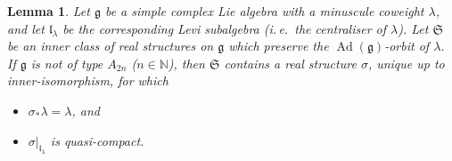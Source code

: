 \documentclass{amsart}
\newcommand{\ie}{i.\,e.}
\newcommand{\Ad}{\operatorname{Ad}}
\newcommand{\g}{\mathfrak{g}}
\newcommand{\N}{\mathbb{N}}
\newcommand{\el}{\mathfrak{l}}
\theoremstyle{definition}
\theoremstyle{plain}
\newtheorem{lem}[defn]{Lemma}
\theoremstyle{remark}
\begin{document}
\begin{lem}
\label{lem:qcrf_extension}
    Let $\g$ be a simple complex Lie algebra with a minuscule coweight $\lambda$, and let $\el_\lambda$ be the corresponding Levi subalgebra (\ie\ the centraliser of $\lambda$). Let $\mathfrak{S}$ be an inner class of real structures on $\g$ which preserve the $\Ad(\g)$-orbit of $\lambda$. If $\g$ is not of type $A_{2n}$ ($n\in \N$), then $\mathfrak{S}$ contains a real structure $\sigma$, unique up to inner-isomorphism, for which
    \begin{itemize}
        \item[(i)] $\sigma_*\lambda = \lambda$, and
        \item[(ii)] $\sigma|_{\el_\lambda}$ is quasi-compact.
    \end{itemize}
\end{lem}
\end{document}
